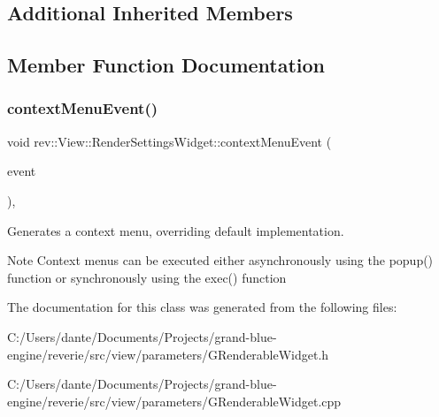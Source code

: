 \subsection*{Additional Inherited Members}


\subsection{Member Function Documentation}
\mbox{\label{classrev_1_1_view_1_1_render_settings_widget_a3b4cb80743160e4e88a4c68ad041906d}} 
\subsubsection{\texorpdfstring{contextMenuEvent()}{contextMenuEvent()}}
{\footnotesize\ttfamily void rev\+::\+View\+::\+Render\+Settings\+Widget\+::context\+Menu\+Event (\begin{DoxyParamCaption}\item[{Q\+Context\+Menu\+Event $\ast$}]{event }\end{DoxyParamCaption})\hspace{0.3cm}{\ttfamily [override]}, {\ttfamily [protected]}}



Generates a context menu, overriding default implementation. 

\begin{DoxyNote}{Note}
Context menus can be executed either asynchronously using the popup() function or synchronously using the exec() function 
\end{DoxyNote}


The documentation for this class was generated from the following files\+:\begin{DoxyCompactItemize}
\item 
C\+:/\+Users/dante/\+Documents/\+Projects/grand-\/blue-\/engine/reverie/src/view/parameters/G\+Renderable\+Widget.\+h\item 
C\+:/\+Users/dante/\+Documents/\+Projects/grand-\/blue-\/engine/reverie/src/view/parameters/G\+Renderable\+Widget.\+cpp\end{DoxyCompactItemize}
